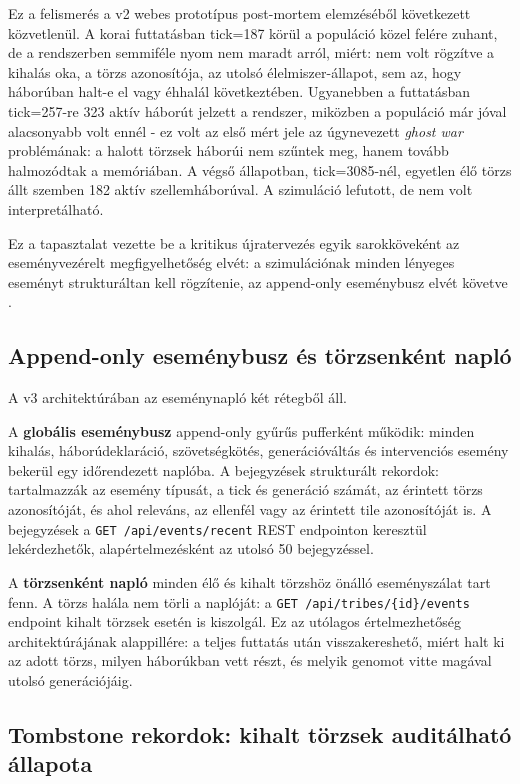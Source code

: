 ﻿\documentclass[a4paper,12pt]{report}
\begin{document}
Ez a felismerés a v2 webes prototípus post-mortem elemzéséből következett közvetlenül.
A korai futtatásban tick=187 körül a populáció közel felére zuhant, de a rendszerben
semmiféle nyom nem maradt arról, miért: nem volt rögzítve a kihalás oka, a törzs azonosítója,
az utolsó élelmiszer-állapot, sem az, hogy háborúban halt-e el vagy éhhalál következtében.
Ugyanebben a futtatásban tick=257-re 323 aktív háborút jelzett a rendszer, miközben
a populáció már jóval alacsonyabb volt ennél - ez volt az első mért jele az úgynevezett
\textit{ghost war} problémának: a halott törzsek háborúi nem szűntek meg,
hanem tovább halmozódtak a memóriában.
A végső állapotban, tick=3085-nél, egyetlen élő törzs állt szemben 182 aktív
szellemháborúval. A szimuláció lefutott, de nem volt interpretálható.

Ez a tapasztalat vezette be a kritikus újratervezés egyik sarokköveként az
eseményvezérelt megfigyelhetőség elvét: a szimulációnak minden lényeges eseményt
strukturáltan kell rögzítenie, az append-only eseménybusz elvét követve \cite{fowler2005}.

\subsection*{Append-only eseménybusz és törzsenként napló}

A v3 architektúrában az eseménynapló két rétegből áll.

A \textbf{globális eseménybusz} append-only gyűrűs pufferként működik: minden kihalás,
háborúdeklaráció, szövetségkötés, generációváltás és intervenciós esemény bekerül
egy időrendezett naplóba. A bejegyzések strukturált rekordok: tartalmazzák az esemény típusát,
a tick és generáció számát, az érintett törzs azonosítóját, és ahol releváns, az ellenfél
vagy az érintett tile azonosítóját is. A bejegyzések a \texttt{GET /api/events/recent}
REST endpointon keresztül lekérdezhetők, alapértelmezésként az utolsó 50 bejegyzéssel.

A \textbf{törzsenként napló} minden élő és kihalt törzshöz önálló eseményszálat tart fenn.
A törzs halála nem törli a naplóját: a \texttt{GET /api/tribes/\{id\}/events}
endpoint kihalt törzsek esetén is kiszolgál. Ez az utólagos értelmezhetőség
architektúrájának alappillére: a teljes futtatás után visszakereshető, miért halt ki
az adott törzs, milyen háborúkban vett részt, és melyik genomot vitte magával utolsó generációjáig.

\subsection*{Tombstone rekordok: kihalt törzsek auditálható állapota}
\end{document}
